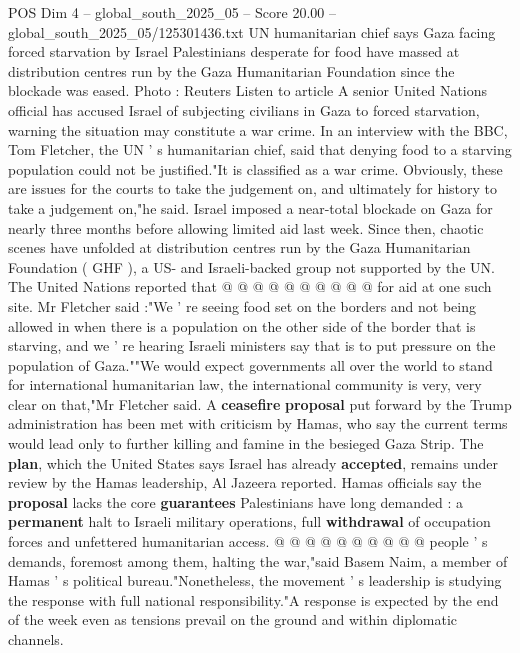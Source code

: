 \begin{textsample}{POS Dim 4 – global\_south\_2025\_05 – Score 20.00 – global\_south\_2025\_05/125301436.txt}  \label{ex:f4_pos_100}
UN humanitarian chief says Gaza facing forced starvation by Israel Palestinians desperate for food have massed at distribution centres run by the Gaza Humanitarian Foundation since the blockade was eased.
Photo : Reuters Listen to article A senior United Nations official has accused Israel of subjecting civilians in Gaza to forced starvation, warning the situation may constitute a war crime.
In an interview with the BBC, Tom Fletcher, the UN ' s humanitarian chief, said that denying food to a starving population could not be justified."It is classified as a war crime.
Obviously, these are issues for the courts to take the judgement on, and ultimately for history to take a judgement on,"he said.
Israel imposed a near-total blockade on Gaza for nearly three months before allowing limited aid last week.
Since then, chaotic scenes have unfolded at distribution centres run by the Gaza Humanitarian Foundation ( GHF ), a US- and Israeli-backed group not supported by the UN.
The United Nations reported that @ @ @ @ @ @ @ @ @ @ for aid at one such site.
Mr Fletcher said :"We ' re seeing food set on the borders and not being allowed in when there is a population on the other side of the border that is starving, and we ' re hearing Israeli ministers say that is to put pressure on the population of Gaza.""We would expect governments all over the world to stand for international humanitarian law, the international community is very, very clear on that,"Mr Fletcher said.
A \textbf{ceasefire} \textbf{proposal} put forward by the Trump administration has been met with criticism by Hamas, who say the current terms would lead only to further killing and famine in the besieged Gaza Strip.
The \textbf{plan}, which the United States says Israel has already \textbf{accepted}, remains under review by the Hamas leadership, Al Jazeera reported.
Hamas officials say the \textbf{proposal} lacks the core \textbf{guarantees} Palestinians have long demanded : a \textbf{permanent} halt to Israeli military operations, full \textbf{withdrawal} of occupation forces and unfettered humanitarian access. @ @ @ @ @ @ @ @ @ @ people ' s demands, foremost among them, halting the war,"said Basem Naim, a member of Hamas ' s political bureau."Nonetheless, the movement ' s leadership is studying the response with full national responsibility."A response is expected by the end of the week even as tensions prevail on the ground and within diplomatic channels.

\end{textsample}
